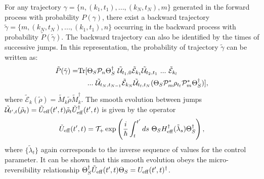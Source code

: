 \documentclass[aps,prx,twocolumn,showpacs,floatfix,superscriptaddress,graphics,longbibliography]{revtex4-1}
\newcommand{\tr}{\mathrm{Tr}}
\newcommand{\E}{{\mathcal E}}
\begin{document}
For any trajectory $\gamma =\{ n, (k_1,t_1),..., (k_N, t_N), m\}$ generated in the forward process with probability $P(\gamma)$, there exist a backward 
trajectory $\tilde{\gamma} = \{m, (k_N,t_N), ..., (k_1,t_1), n\}$ occurring in the backward process with probability $\tilde{P}(\tilde{\gamma})$. The backward trajectory can also be identified by the times of successive jumps.
In this representation, the probability of trajectory $\tilde{\gamma}$ can be written as:
\begin{align}\label{Pbac}
 \tilde{P}(\tilde{\gamma}) = & \tr[ \Theta_S \mathcal{P}_n \Theta_S^\dagger ~\tilde{\mathcal{U}}_{t_1, 0} \tilde{\E}_{k_1} \tilde{\mathcal{U}}_{t_2, t_1}~ ... ~\tilde{\E}_{k_l}~ \nonumber \\
& ~~~~ ...  ~ \tilde{\mathcal{U}}_{t_N, t_{N-1}} \tilde{\E}_{k_N} \tilde{\mathcal{U}}_{t_{\rm f}, t_N} (\Theta_S \mathcal{P}_m^\ast \rho_{t_{\rm f}} \mathcal{P}_m^\ast \Theta_S^\dagger)],
\end{align}
where $\tilde\E_k(\tilde\rho)=\tilde M_k\tilde\rho\tilde M^\dagger_k$.
The smooth evolution between jumps $\tilde{\mathcal{U}}_{t' ,t} (\tilde{\rho}_{t}) = \tilde{U}_{\rm eff}(t',t) \tilde{\rho}_{t} \tilde{U}_{\rm eff}^\dagger(t',t)$ is given by the operator
\begin{equation} \label{drift-sym}
\tilde{U}_{\rm eff} (t' ,t) = \mathcal{T}_{+} \exp \left( \frac{i}{\hbar} \int_t^{t'} ds ~\Theta_S H_{\rm eff}^\dagger (\tilde{\lambda}_{s}) \Theta_S^\dagger \right), 
\end{equation}
where $\{ \tilde{\lambda}_t \}$ again corresponds to the inverse sequence of values for the control parameter. It can be shown that this smooth evolution obeys the micro-reversibility relationship
$\Theta_S^\dagger \tilde{U}_{\rm eff} (t' ,t)  \Theta_S = U_{\rm eff}(t', t)^\dagger$.
\end{document}
